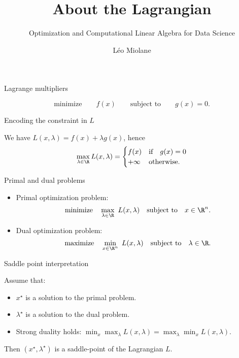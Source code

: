 \documentclass{beamer}
\title{About the Lagrangian}
\subtitle{Optimization and Computational Linear Algebra for Data Science}
\author{Léo Miolane}
\date{}
\begin{document}
\setcounter{showProgressBar}{0}
\setcounter{showSlideNumbers}{0}

\frame{\titlepage}
\setcounter{framenumber}{0}
\setcounter{showSlideNumbers}{1}



\begin{frame}[t]{Lagrange multipliers}
	\grid

	\vspace{-0.5cm}
	$$
	\text{minimize}  \qquad f(x) \qquad \text{subject to} \qquad g(x) = 0.
	$$


\end{frame}

\begin{frame}[t]{Encoding the constraint in $L$}
	\grid

	\vspace{-0.2cm}
	We have $L(x,\lambda) = f(x) + \lambda g(x)$, hence
	$$
	\max_{\lambda \in \R} L(x,\lambda) = 
	\begin{cases}
		f(x) & \text{if} \quad g(x) = 0 \\
		+\infty & \text{otherwise}.
	\end{cases}
	$$



\end{frame}

\begin{frame}[t]{Primal and dual problems}
	\grid

	\vspace{-0.2cm}
	\begin{itemize}
		\item Primal optimization problem:
			$$
			\text{minimize} \quad \max_{\lambda \in \R} \ L(x,\lambda) \quad \text{subject to} \quad x \in \R^n.
			$$
		\item Dual optimization problem:
			$$
			\text{maximize} \quad \min_{x \in \R^n} \ L(x,\lambda) \quad \text{subject to} \quad \lambda \in \R.
			$$
	\end{itemize}

\end{frame}

\begin{frame}[t]{Saddle point interpretation}
	\grid

	\vspace{-0.2cm}

	\begin{theorem}
		Assume that:
	\begin{itemize}
		\item $x^{\star}$ is a solution to the primal problem.
		\item $\lambda^{\star}$ is a solution to the dual problem.
		\item Strong duality holds: $\min_x \max_{\lambda} L(x,\lambda) = \max_{\lambda} \min_{x} L(x,\lambda)$.
	\end{itemize}
	\vspace{0.2cm}
	Then $(x^{\star},\lambda^{\star})$ is a saddle-point of the Lagrangian $L$.
	\end{theorem}

\end{frame}
\end{document}
